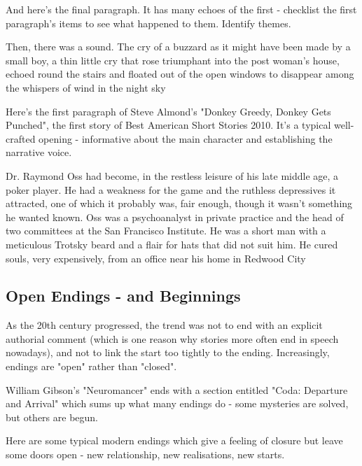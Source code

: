 \documentclass[11pt]{article}
\newenvironment{narrow}[2]{%
 \begin{list}{}{%
  \setlength{\topsep}{0pt}%
  \setlength{\leftmargin}{#1}%
  \setlength{\rightmargin}{#2}%
  \setlength{\listparindent}{\parindent}%
  \setlength{\itemindent}{\parindent}%
  \setlength{\parsep}{\parskip}%
 }%
\item[]}{\end{list}}
\begin{document}
And here's the final paragraph. It has many echoes of the first - checklist the first paragraph's items to see what happened to them. Identify themes.

\begin{narrow}{1.0cm}{1.0cm}
Then, there was a sound. The cry of a buzzard as it might have been made by 
a small boy, a thin little cry that rose triumphant into the post woman's 
house, echoed round the stairs and floated out of the open windows to 
disappear among the whispers of wind in the night sky
\end{narrow}

Here's the first paragraph of Steve Almond's "Donkey Greedy, Donkey Gets Punched", the first story of Best American Short Stories 2010. It's a typical well-crafted opening - informative about the main character and establishing the narrative voice.

\begin{narrow}{1.0cm}{1.0cm}
Dr. Raymond Oss had become, in the restless leisure of his late middle age, a 
poker player. He had a weakness for the game and the ruthless depressives it 
attracted, one of which it probably was, fair enough, though it wasn't 
something he wanted known. Oss was a psychoanalyst in private practice and
 the head of two committees at the San Francisco Institute. He was a short 
man with a meticulous Trotsky beard and a flair for hats that did not suit 
him. He cured souls, very expensively, from an office near his home in 
Redwood City
\end{narrow}



\subsection*{Open Endings - and Beginnings}

As the 20th century progressed, the trend was not to end with an explicit authorial comment (which is one reason why stories more often end in speech nowadays), and not to link the start too tightly to the ending. Increasingly, endings are "open" rather than "closed".




William Gibson's "Neuromancer" ends with a section entitled "Coda: Departure and Arrival" which sums up what many endings do - some mysteries are solved, but others are begun.




Here are some typical modern endings which give a feeling of closure but leave some doors open - new relationship, new realisations, new starts.
\end{document}
